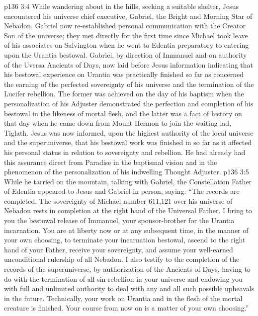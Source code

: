 \vs p136 3:4 \pc While wandering about in the hills, seeking a suitable shelter, Jesus encountered his universe chief executive, Gabriel, the Bright and Morning Star of Nebadon. Gabriel now re\hyp{}established personal communication with the Creator Son of the universe; they met directly for the first time since Michael took leave of his associates on Salvington when he went to Edentia preparatory to entering upon the Urantia bestowal. Gabriel, by direction of Immanuel and on authority of the Uversa Ancients of Days, now laid before Jesus information indicating that his bestowal experience on Urantia was practically finished so far as concerned the earning of the perfected sovereignty of his universe and the termination of the Lucifer rebellion. The former was achieved on the day of his baptism when the personalization of his Adjuster demonstrated the perfection and completion of his bestowal in the likeness of mortal flesh, and the latter was a fact of history on that day when he came down from Mount Hermon to join the waiting lad, Tiglath. Jesus was now informed, upon the highest authority of the local universe and the superuniverse, that his bestowal work was finished in so far as it affected his personal status in relation to sovereignty and rebellion. He had already had this assurance direct from Paradise in the baptismal vision and in the phenomenon of the personalization of his indwelling Thought Adjuster.
\vs p136 3:5 While he tarried on the mountain, talking with Gabriel, the Constellation Father of Edentia appeared to Jesus and Gabriel in person, saying: “The records are completed. The sovereignty of Michael number 611,121 over his universe of Nebadon rests in completion at the right hand of the Universal Father. I bring to you the bestowal release of Immanuel, your sponsor\hyp{}brother for the Urantia incarnation. You are at liberty now or at any subsequent time, in the manner of your own choosing, to terminate your incarnation bestowal, ascend to the right hand of your Father, receive your sovereignty, and assume your well\hyp{}earned unconditional rulership of all Nebadon. I also testify to the completion of the records of the superuniverse, by authorization of the Ancients of Days, having to do with the termination of all sin\hyp{}rebellion in your universe and endowing you with full and unlimited authority to deal with any and all such possible upheavals in the future. Technically, your work on Urantia and in the flesh of the mortal creature is finished. Your course from now on is a matter of your own choosing.”
